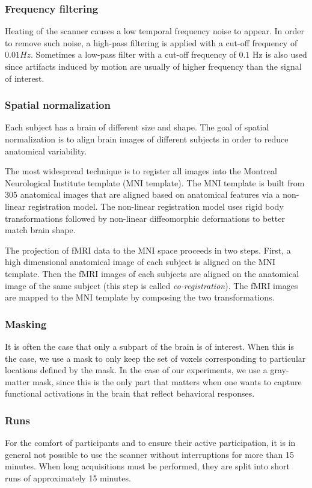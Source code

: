 \subsubsection{Frequency filtering}
Heating of the scanner causes a low temporal frequency noise to appear. In order
to remove such noise, a high-pass filtering is applied with a cut-off frequency
of $0.01 Hz$. Sometimes a low-pass filter with a cut-off frequency of $0.1$ Hz is also used since artifacts induced by motion are usually of higher frequency than the signal of interest.

\subsubsection{Spatial normalization}
Each subject has a brain of different size and shape.
The goal of spatial normalization is to align brain images of different subjects in order to reduce anatomical variability.

The most widespread technique is to register all images into the Montreal Neurological
Institute template (MNI template). The
MNI template is built from 305 anatomical images that are aligned based on
anatomical features via a non-linear registration model.
The non-linear registration model uses rigid body transformations followed
by non-linear diffeomorphic deformations to better match brain shape. 

The projection of fMRI data to the MNI space proceeds in two steps.
First, a high dimensional anatomical image of each
subject is aligned on the MNI template. Then the fMRI images of each subjects are 
aligned on the anatomical image of the same subject (this step is called
\emph{co-registration}). The fMRI images are mapped to the MNI template by
composing the two transformations.


\subsubsection{Masking}
It is often the case that only a subpart of the brain is of interest. When this is the case, we use a mask to only keep the set of voxels corresponding to particular locations defined by the mask.
In the case of our experiments, we use a gray-matter mask, since this is the
only part that matters when one wants to capture functional activations in the
brain that reflect behavioral responses.

\subsubsection{Runs}
For the comfort of participants and to ensure their active participation, it is in general not possible to use the scanner without interruptions for more than 15 minutes.  When long acquisitions must be
performed, they are split into short runs of approximately 15 minutes.


